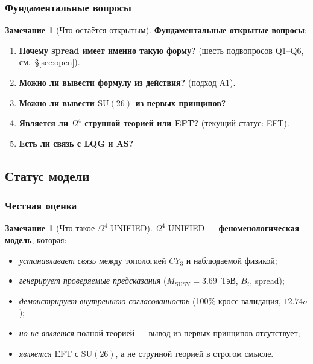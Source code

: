 \documentclass[11pt,a4paper]{article}
\newcommand{\SU}{\ensuremath{\mathrm{SU}}}
\newcommand{\CY}{\ensuremath{CY_3}}
\newcommand{\Om}{\ensuremath{\Omega^4}}
\theoremstyle{definition}
\newtheorem{remark}[theorem]{Замечание}
\begin{document}
\subsubsection{Фундаментальные вопросы}

\begin{remark}[Что остаётся открытым]
\label{rem:conclusions-fundamental}
\textbf{Фундаментальные открытые вопросы}:
\begin{enumerate}
    \item \textbf{Почему spread имеет именно такую форму?}
          (шесть подвопросов Q1--Q6, см.~\S\ref{sec:open}).
    \item \textbf{Можно ли вывести формулу из действия?}
          (подход A1).
    \item \textbf{Можно ли вывести $\SU(26)$ из первых
          принципов?}
    \item \textbf{Является ли $\Om$ струнной теорией
          или EFT?} (текущий статус: EFT).
    \item \textbf{Есть ли связь с LQG и AS?}
\end{enumerate}
\end{remark}

\subsection{Статус модели}
\label{subsec:conclusions-status}

\subsubsection{Честная оценка}

\begin{remark}[Что такое $\Om$-UNIFIED]
\label{rem:conclusions-what-is}
$\Om$-UNIFIED --- \textbf{феноменологическая модель}, которая:
\begin{itemize}
    \item \emph{устанавливает связь} между топологией $\CY$
          и наблюдаемой физикой;
    \item \emph{генерирует проверяемые предсказания}
          ($M_{\text{SUSY}} = 3.69$~ТэВ, $B_i$, spread);
    \item \emph{демонстрирует внутреннюю согласованность}
          (100\% кросс-валидация, $12.74\sigma$);
    \item \emph{но не является} полной теорией ---
          вывод из первых принципов отсутствует;
    \item \emph{является} EFT с $\SU(26)$, а не струнной
          теорией в строгом смысле.
\end{itemize}
\end{remark}
\end{document}
